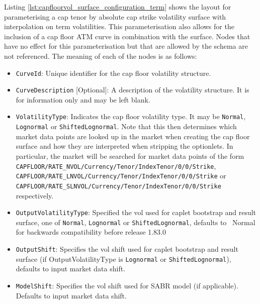
Listing \ref{lst:capfloorvol_surface_configuration_term} shows the layout for parameterising a cap tenor by absolute cap strike volatility surface with interpolation on term volatilities. This parameterisation also allows for the inclusion of a cap floor ATM curve in combination with the surface. Nodes that have no effect for this parameterisation but that are allowed by the schema are not referenced. The meaning of each of the nodes is as follows:

\begin{itemize}
\item
\lstinline!CurveId!: Unique identifier for the cap floor volatility structure.

\item \lstinline!CurveDescription! [Optional]:
A description of the volatility structure. It is for information only and may be left blank.

\item \lstinline!VolatilityType!:
Indicates the cap floor volatility type. It may be \lstinline!Normal!, \lstinline!Lognormal! or \lstinline!ShiftedLognormal!. Note that this then determines which market data points are looked up in the market when creating the cap floor surface and how they are interpreted when stripping the optionlets. In particular, the market will be searched for market data points of the form \lstinline!CAPFLOOR/RATE_NVOL/Currency/Tenor/IndexTenor/0/0/Strike!, \lstinline!CAPFLOOR/RATE_LNVOL/Currency/Tenor/IndexTenor/0/0/Strike! or \lstinline!CAPFLOOR/RATE_SLNVOL/Currency/Tenor/IndexTenor/0/0/Strike! respectively.

\item \lstinline!OutputVolatilityType!: Specified the vol used for caplet bootstrap and result surface, one of {\tt Normal},
  {\tt Lognormal} or {\tt ShiftedLognormal}, defaults to {\ Normal} for backwards compatibility before release 1.83.0

\item \lstinline!OutputShift!: Specifies the vol shift used for caplet bootstrap and result surface (if OutputVolatilityType is
{\tt Lognormal} or {\tt ShiftedLognormal}), defaults to input market data shift.

\item \lstinline!ModelShift!: Specifies the vol shift used for SABR model (if applicable). Defaults to input market data shift.


\end{itemize}
